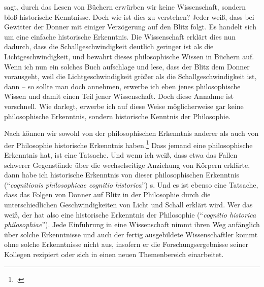  sagt, durch das Lesen von Büchern
erwürben wir keine Wissenschaft, sondern bloß historische Kenntnisse. Doch wie
ist dies zu verstehen? Jeder weiß, dass bei Gewitter der Donner mit einiger
Verzögerung auf den Blitz folgt. Es handelt sich um eine einfache historische
Erkenntnis. Die Wissenschaft erklärt dies nun dadurch, dass die
Schallgeschwindigkeit deutlich geringer ist als die Lichtgeschwindigkeit, und
bewahrt dieses philosophische Wissen in Büchern auf. Wenn ich nun ein solches
Buch aufschlage und lese, dass der Blitz dem Donner vorausgeht, weil die
Lichtgeschwindigkeit größer als die Schallgeschwindigkeit ist, dann -- so sollte
man doch annehmen, erwerbe ich eben jenes philosophische Wissen und damit einen
Teil jener Wissenschaft. Doch diese Annahme ist vorschnell. Wie
 darlegt,
erwerbe ich auf diese Weise möglicherweise gar keine philosophische Erkenntnis,
sondern historische Kenntnis der Philosophie.

Nach  können
wir sowohl von der philosophischen Erkenntnis anderer als auch von der
Philosophie historische Erkenntnis
haben.\footnote{\cite[Vgl.][\S\S~8,
50]{Wolff:Discursuspraeliminarisdephilosophiaingenere1996}.} Dass jemand eine
philosophische Erkenntnis hat, ist eine Tatsache.
Und wenn ich weiß, dass etwa  das Fallen schwerer Gegenstände
über die wechselseitige Anziehung von Körpern erklärte, dann habe ich historische Erkenntnis von dieser
philosophischen Erkenntnis (\enquote{\emph{cognitionis philosophicae cognitio
historica}}) s. Und es ist ebenso eine Tatsache, dass das
Folgen von Donner auf Blitz in der Philosophie durch die unterschiedlichen
Geschwindigkeiten von Licht und Schall erklärt wird. Wer das
weiß, der hat also eine historische Erkenntnis der Philosophie
(\enquote{\emph{cognitio historica philosophiae}}). Jede Einführung in eine
Wissenschaft nimmt ihren Weg anfänglich über solche Erkenntnisse und auch der
fertig ausgebildete Wissenschaftler kommt ohne solche Erkenntnisse nicht aus,
insofern er die Forschungsergebnisse seiner Kollegen rezipiert oder sich in
einen neuen Themenbereich einarbeitet.

